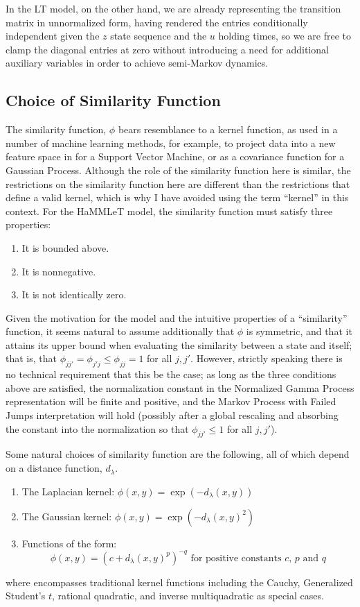 In the LT model, on the other hand, we are already representing the
transition matrix in unnormalized form, having rendered the entries
conditionally independent given the $z$ state sequence and the $u$
holding times, so we are free to clamp the diagonal entries at zero
without introducing a need for additional auxiliary variables in order
to achieve semi-Markov dynamics.

\subsection{Choice of Similarity Function}
The similarity function, $\phi$
bears resemblance to a kernel function, as used in a number of machine
learning methods, for example, to project data into a new feature space in
for a Support Vector Machine, or as a covariance function for a
Gaussian Process.  Although the role of the similarity function here
is similar, the restrictions on the similarity function here are different
than the restrictions that define a valid kernel, which is why I have
avoided using the term ``kernel'' in this context.  For the HaMMLeT
model, the similarity function must satisfy three properties:
\begin{enumerate}
\item It is bounded above.
\item It is nonnegative.
\item It is not identically zero.
\end{enumerate}

Given the motivation for the model and the intuitive properties of a
``similarity'' function, it seems natural to assume
additionally that $\phi$ is symmetric, and that it attains its upper
bound when evaluating the similarity between a state and itself; that
is, that $\phi_{jj'} = \phi_{j'j} \leq \phi_{jj} = 1$ for all $j,j'$.
However, strictly speaking there is no technical requirement that this
be the case; as long as the three conditions above are satisfied, the
normalization constant in the Normalized Gamma Process representation 
will be finite and positive, and the Markov Process with Failed Jumps
interpretation will hold (possibly after a global rescaling and
absorbing the constant into the
normalization so that $\phi_{jj'} \leq 1$ for all $j,j'$).

Some natural choices of similarity function are the following, all of
which depend on a distance function, $d_\lambda$.
\begin{enumerate}
\item The Laplacian kernel: $\phi(x,y) = \exp(-d_{\lambda}(x,y))$
\item The Gaussian kernel: $\phi(x,y) = \exp(-d_{\lambda}(x,y)^2)$
\item \label{rational} Functions of the form:
  \begin{equation*}
  \phi(x,y) = \left(c +
    d_{\lambda}(x,y)^p\right)^{-q} \text{ for positive constants $c$,
  $p$ and $q$}
  \end{equation*}
\end{enumerate}
where \label{rational} encompasses traditional kernel functions
including the Cauchy, Generalized Student's $t$, rational quadratic,
and inverse multiquadratic as special cases.


